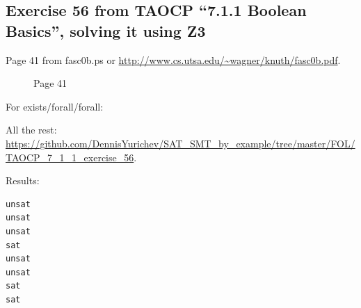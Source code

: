 \subsection{Exercise 56 from TAOCP ``7.1.1 Boolean Basics'', solving it using Z3}

Page 41 from fasc0b.ps or \url{http://www.cs.utsa.edu/~wagner/knuth/fasc0b.pdf}.

\begin{figure}[H]
\centering
{}
\caption{Page 41}
\end{figure}

For exists/forall/forall:



All the rest: \url{https://github.com/DennisYurichev/SAT_SMT_by_example/tree/master/FOL/TAOCP_7_1_1_exercise_56}.

Results:



\begin{lstlisting}
unsat
unsat
unsat
sat
unsat
unsat
sat
sat
\end{lstlisting}

